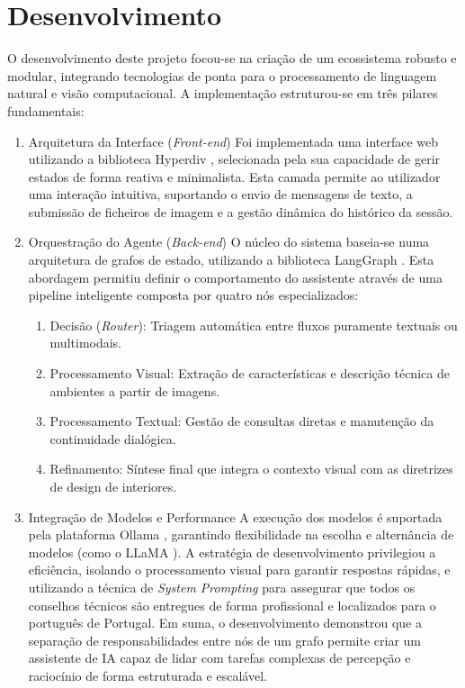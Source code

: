 \documentclass[a4paper,12pt]{scrreprt}
\begin{document}
\chapter{Desenvolvimento}
    O desenvolvimento deste projeto focou-se na criação de um ecossistema robusto e modular, integrando tecnologias de ponta para o processamento de linguagem natural e visão computacional. A implementação estruturou-se em três pilares fundamentais:

    \begin{enumerate}
        \item Arquitetura da Interface (\textit{Front-end})
        Foi implementada uma interface web utilizando a biblioteca Hyperdiv \cite{hyperdiv}, selecionada pela sua capacidade de gerir estados de forma reativa e minimalista. Esta camada permite ao utilizador uma interação intuitiva, suportando o envio de mensagens de texto, a submissão de ficheiros de imagem e a gestão dinâmica do histórico da sessão.
        \item Orquestração do Agente (\textit{Back-end})
        O núcleo do sistema baseia-se numa arquitetura de grafos de estado, utilizando a biblioteca LangGraph \cite{langgraph}. Esta abordagem permitiu definir o comportamento do assistente através de uma pipeline inteligente composta por quatro nós especializados:
        \begin{enumerate}
            \item Decisão (\textit{Router}): Triagem automática entre fluxos puramente textuais ou multimodais.
            \item Processamento Visual: Extração de características e descrição técnica de ambientes a partir de imagens.
            \item Processamento Textual: Gestão de consultas diretas e manutenção da continuidade dialógica.
            \item Refinamento: Síntese final que integra o contexto visual com as diretrizes de design de interiores.
        \end{enumerate}
        \item Integração de Modelos e Performance
        A execução dos modelos é suportada pela plataforma Ollama \cite{ollama}, garantindo flexibilidade na escolha e alternância de modelos (como o LLaMA \cite{llama}). A estratégia de desenvolvimento privilegiou a eficiência, isolando o processamento visual para garantir respostas rápidas, e utilizando a técnica de \textit{System Prompting} para assegurar que todos os conselhos técnicos são entregues de forma profissional e localizados para o português de Portugal.
        Em suma, o desenvolvimento demonstrou que a separação de responsabilidades entre nós de um grafo permite criar um assistente de IA capaz de lidar com tarefas complexas de percepção e raciocínio de forma estruturada e escalável.
    \end{enumerate}
\end{document}
